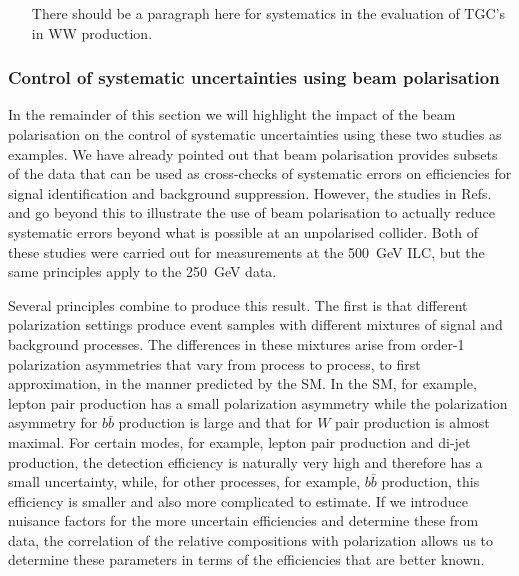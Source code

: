 \begin{itemize}

\item  [There should be a paragraph here for systematics in the evaluation of TGC's in WW production. ]
\end{itemize}



\subsubsection{Control of systematic uncertainties using beam polarisation} 
\label{subsubsec:pol:systematics}

In the remainder of this section we will highlight the impact of the beam polarisation on the control of systematic uncertainties using these two studies as examples.   We have already pointed out that beam polarisation provides subsets of the data that can be used as cross-checks of systematic errors on 
efficiencies for signal identification and background suppression.  However, the studies
in Refs.~\cite{bib:PhDRobert} and \cite{Habermehl:417605} go beyond this to illustrate the use of beam polarisation to actually reduce systematic errors beyond what is possible at 
an unpolarised collider.   Both of these studies were carried out for measurements at the 
500~GeV ILC, but the same principles apply to the 250~GeV data.

Several principles combine to produce this  result.   The first is that different polarization
settings produce event samples with different mixtures of signal and background 
processes.   The differences in these  mixtures arise from order-1 polarization asymmetries that vary from 
process to process, to first approximation, in the manner predicted by the SM.   In the SM, for example, lepton pair production has a small polarization asymmetry while the   polarization asymmetry for $b\bar b $ production is large and that for $W$ pair production is almost maximal.   For certain modes, for example, lepton pair production and di-jet production, the detection  efficiency is naturally very high and therefore has a small uncertainty, while, for other processes, for example, $b\bar b$ production, this efficiency is smaller and also more complicated to estimate.  If we introduce nuisance factors for the more uncertain efficiencies
and determine these from data, the correlation of the relative compositions with polarization
allows us to determine these parameters in terms of the efficiencies that are better known. 

